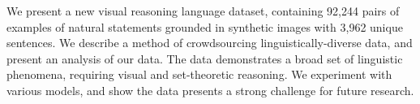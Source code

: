 We present a new visual reasoning language dataset, containing 92,244 pairs of examples of natural statements grounded in synthetic images with 3,962 unique sentences. We describe a method of crowdsourcing linguistically-diverse data, and present an analysis of our data. The data demonstrates a broad set of linguistic phenomena, requiring visual and set-theoretic reasoning. We experiment with various models, and show the data presents a strong challenge for future research.

